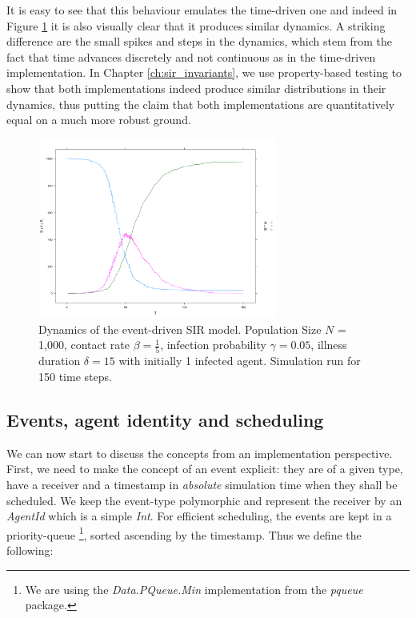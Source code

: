 \medskip

It is easy to see that this behaviour emulates the time-driven one and indeed in Figure \ref{fig:sir_eventdriven_dynamics} it is also visually clear that it produces similar dynamics. A striking difference are the small spikes and steps in the dynamics, which stem from the fact that time advances discretely and not continuous as in the time-driven implementation. In Chapter \ref{ch:sir_invariants}, we use property-based testing to show that both implementations indeed produce similar distributions in their dynamics, thus putting the claim that both implementations are quantitatively equal on a much more robust ground.

\begin{figure}
	\centering
	\includegraphics[width=0.7\textwidth, angle=0]{./fig/eventdriven/sir_eventdriven.png}
	\caption{Dynamics of the event-driven SIR model. Population Size $N$ = 1,000, contact rate $\beta = \frac{1}{5}$, infection probability $\gamma = 0.05$, illness duration $\delta = 15$ with initially 1 infected agent. Simulation run for 150 time steps.}
	\label{fig:sir_eventdriven_dynamics}
\end{figure}

\subsection{Events, agent identity and scheduling}
We can now start to discuss the concepts from an implementation perspective. First, we need to make the concept of an event explicit: they are of a given type, have a receiver and a timestamp in \textit{absolute} simulation time when they shall be scheduled. We keep the event-type polymorphic and represent the receiver by an \textit{AgentId} which is a simple \textit{Int}. For efficient scheduling, the events are kept in a priority-queue \footnote{We are using the \textit{Data.PQueue.Min} implementation from the \textit{pqueue} package.}, sorted ascending by the timestamp. Thus we define the following:

